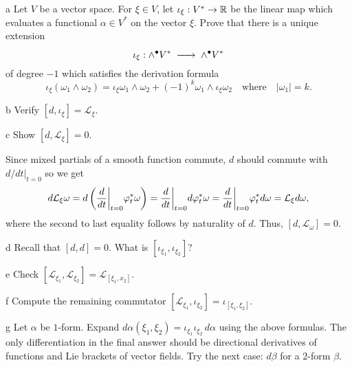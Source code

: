 \documentclass{../../templates/lkx_pset}
\begin{document}
\begin{parts}
  \begin{part}{a}
    Let $V$ be a vector space. For $\xi\in V$, let $\iota_\xi : V^* \to \mathbb{R}$ be the linear map which evaluates a functional $\alpha\in V^*$ on the vector $\xi$. Prove that there is a unique extension
    \[
      \iota_\xi : {\wedge}^\bullet V^* \longto \wedge^\bullet V^*
    \]
    of degree $-1$ which satisfies the derivation formula
    \[
      \iota_\xi(\omega_1 \wedge \omega_2) = \iota_\xi \omega_1 \wedge \omega_2 + (-1)^k \omega_1\wedge \iota_\xi\omega_2\quad\textrm{where}\quad |\omega_1|=k.
    \]
  \end{part}

  \begin{part}{b}
    Verify $[d,\iota_\xi] = \mathcal{L}_\xi$.
  \end{part}

  \begin{part}{c}
    Show $[d,\mathcal{L}_\xi]=0$.
  \end{part}

  Since mixed partials of a smooth function commute, $d$ should commute with $d/dt|_{t=0}$ so we get
  \[
    \begin{aligned}
      d\mathcal{L}_\xi\omega = d\left(\restr{\frac{d}{dt}}{t=0} \varphi_t^*\omega\right) = \restr{\frac{d}{dt}}{t=0} d\varphi^*_t \omega = \restr{\frac{d}{dt}}{t=0} \varphi^*_t d\omega = \mathcal{L}_\xi d\omega,
    \end{aligned}
  \]
  where the second to last equality follows by naturality of $d$. Thus, $[d,\mathcal{L}_\omega]=0$.

  \begin{part}{d}
    Recall that $[d, d]=0$. What is $[\iota_{\xi_1}, \iota_{\xi_2}]$?
  \end{part}

  \begin{part}{e}
    Check $[\mathcal{L}_{\xi_1}, \mathcal{L}_{\xi_2}] = \mathcal{L}_{[\xi_1, x_2]}$.
  \end{part}

  \begin{part}{f}
    Compute the remaining commutator $[\mathcal{L}_{\xi_1}, \iota_{\xi_2}] = \iota_{[\xi_1,\xi_2]}$.
  \end{part}

  \begin{part}{g}
    Let $\alpha$ be $1$-form. Expand $d\alpha(\xi_1, \xi_2) = \iota_{\xi_1}\iota_{\xi_2}\,d\alpha$ using the above formulas. The only differentiation in the final answer should be directional derivatives of functions and Lie brackets of vector fields. Try the next case: $d\beta$ for a $2$-form $\beta$.
  \end{part}
\end{parts}
\end{document}
